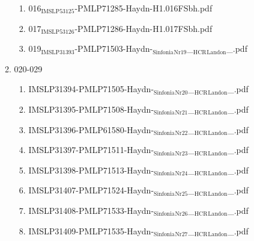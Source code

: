 \documentclass[11pt]{article}
\begin{document}
\begin{enumerate}
\begin{enumerate}
\begin{enumerate}
\item 016$_{\text{IMSLP53125}}$-PMLP71285-Haydn-H1.016FSbh.pdf
\label{sec-1-1-1-1-44-38-7-2-6}

\item 017$_{\text{IMSLP53126}}$-PMLP71286-Haydn-H1.017FSbh.pdf
\label{sec-1-1-1-1-44-38-7-2-7}

\item 019$_{\text{IMSLP31393}}$-PMLP71503-Haydn-$_{\text{Sinfonia}}$$_{\text{Nr19}}$\_$_{\text{HCR}}$$_{\text{Landon}}$\_.pdf
\label{sec-1-1-1-1-44-38-7-2-8}
\end{enumerate}

\item 020-029
\label{sec-1-1-1-1-44-38-7-3}
\begin{enumerate}
\item IMSLP31394-PMLP71505-Haydn-$_{\text{Sinfonia}}$$_{\text{Nr20}}$\_$_{\text{HCR}}$$_{\text{Landon}}$\_.pdf
\label{sec-1-1-1-1-44-38-7-3-1}

\item IMSLP31395-PMLP71508-Haydn-$_{\text{Sinfonia}}$$_{\text{Nr21}}$\_$_{\text{HCR}}$$_{\text{Landon}}$\_.pdf
\label{sec-1-1-1-1-44-38-7-3-2}

\item IMSLP31396-PMLP61580-Haydn-$_{\text{Sinfonia}}$$_{\text{Nr22}}$\_$_{\text{HCR}}$$_{\text{Landon}}$\_.pdf
\label{sec-1-1-1-1-44-38-7-3-3}

\item IMSLP31397-PMLP71511-Haydn-$_{\text{Sinfonia}}$$_{\text{Nr23}}$\_$_{\text{HCR}}$$_{\text{Landon}}$\_.pdf
\label{sec-1-1-1-1-44-38-7-3-4}

\item IMSLP31398-PMLP71513-Haydn-$_{\text{Sinfonia}}$$_{\text{Nr24}}$\_$_{\text{HCR}}$$_{\text{Landon}}$\_.pdf
\label{sec-1-1-1-1-44-38-7-3-5}

\item IMSLP31407-PMLP71524-Haydn-$_{\text{Sinfonia}}$$_{\text{Nr25}}$\_$_{\text{HCR}}$$_{\text{Landon}}$\_.pdf
\label{sec-1-1-1-1-44-38-7-3-6}

\item IMSLP31408-PMLP71533-Haydn-$_{\text{Sinfonia}}$$_{\text{Nr26}}$\_$_{\text{HCR}}$$_{\text{Landon}}$\_.pdf
\label{sec-1-1-1-1-44-38-7-3-7}

\item IMSLP31409-PMLP71535-Haydn-$_{\text{Sinfonia}}$$_{\text{Nr27}}$\_$_{\text{HCR}}$$_{\text{Landon}}$\_.pdf
\label{sec-1-1-1-1-44-38-7-3-8}
\end{enumerate}


\end{enumerate}
\end{enumerate}
\end{document}
